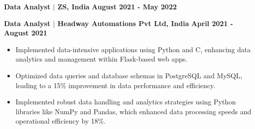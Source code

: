 \documentclass{article}
\begin{document}
\vspace{2mm} 

\noindent \textbf{Data Analyst $\mid$ ZS, India} \hfill \textbf{August 2021 - May 2022}

\vspace{2mm} 

\noindent \textbf{Data Analyst $\mid$ Headway Automations Pvt Ltd, India} \hfill \textbf{April 2021 - August 2021}
\begin{itemize}[noitemsep,nolistsep,leftmargin=*]
\item {\small Implemented data-intensive applications using Python and C, enhancing data analytics and management within Flask-based web apps.}
\item {\small Optimized data queries and database schemas in PostgreSQL and MySQL, leading to a 15\% improvement in data performance and efficiency.}
\item {\small Implemented robust data handling and analytics strategies using Python libraries like NumPy and Pandas, which enhanced data processing speeds and operational efficiency by 18\%.}\\
\end{itemize}
\end{document}
